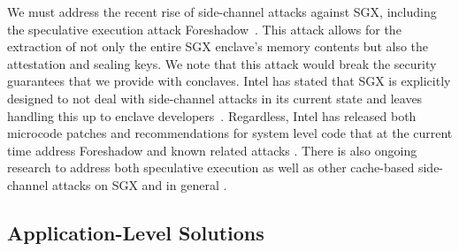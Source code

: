 %
%
%
%


%
We must address the recent rise of side-channel attacks against SGX, including
the speculative execution attack Foreshadow~\cite{foreshadow,
weisse2018foreshadow}.  
%
This attack allows for the extraction of not only the entire SGX enclave's
memory contents but also the attestation and sealing keys.  
%
We note that this attack would break the security guarantees that we provide
with conclaves.
%
Intel has stated that SGX is explicitly designed to not deal with side-channel
attacks in its current state and leaves handling this up to enclave
developers~\cite{sgx-sidechannel, sgx-developers}.
%
Regardless, Intel has released both microcode patches and recommendations for
system level code that at the current time address Foreshadow and known related
attacks \cite{sgx-patch, canella2018systematic, weisse2018foreshadow}.  
%
There is also ongoing research to address both speculative execution as well as
other cache-based side-channel attacks on SGX and in general
\cite{yan2018invisispec, oleksenko2018varys, canella2018systematic, shih2017t}.




\subsection{Application-Level Solutions}

